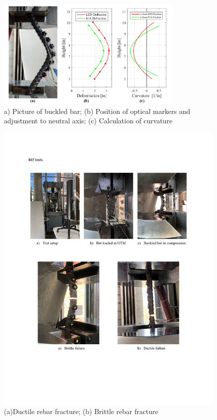 \begin{figure}[htbp]
    \centering
    \includegraphics[width=0.8\textwidth]{Chapter-3/figs/BBT_Curvature}
    \caption{a) Picture of buckled bar; (b) Position of optical markers and adjustment to neutral axis; (c) Calculation of curvature \cite{Barcley2018}}
    \label{fig:BBT_Curvature}
\end{figure}
\begin{figure}
    \centering
    \includegraphics[width=1.0\textwidth]{VAC Thesis 2.0/Chapter-3/figs/bbt_ductile_vs_brittle.pdf}
    \caption{(a)Ductile rebar fracture; (b) Brittle rebar fracture}
    \label{fig:BBT_DuctileBrittle}
\end{figure}
